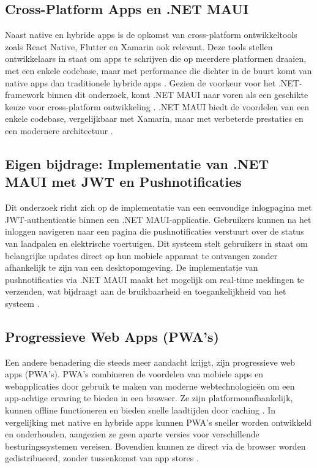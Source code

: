 \subsection{Cross-Platform Apps en .NET MAUI}
\noindent Naast native en hybride apps is de opkomst van cross-platform ontwikkeltools zoals React Native, Flutter en Xamarin ook relevant. Deze tools stellen ontwikkelaars in staat om apps te schrijven die op meerdere platformen draaien, met een enkele codebase, maar met performance die dichter in de buurt komt van native apps dan traditionele hybride apps \autocite{}. Gezien de voorkeur voor het .NET-framework binnen dit onderzoek, komt .NET MAUI naar voren als een geschikte keuze voor cross-platform ontwikkeling \autocite{}. .NET MAUI biedt de voordelen van een enkele codebase, vergelijkbaar met Xamarin, maar met verbeterde prestaties en een modernere architectuur \autocite{}.

\subsection{Eigen bijdrage: Implementatie van .NET MAUI met JWT en Pushnotificaties}
\noindent Dit onderzoek richt zich op de implementatie van een eenvoudige inlogpagina met JWT-authenticatie binnen een .NET MAUI-applicatie. Gebruikers kunnen na het inloggen navigeren naar een pagina die pushnotificaties verstuurt over de status van laadpalen en elektrische voertuigen. Dit systeem stelt gebruikers in staat om belangrijke updates direct op hun mobiele apparaat te ontvangen zonder afhankelijk te zijn van een desktopomgeving. De implementatie van pushnotificaties via .NET MAUI maakt het mogelijk om real-time meldingen te verzenden, wat bijdraagt aan de bruikbaarheid en toegankelijkheid van het systeem \autocite{}.

\subsection{Progressieve Web Apps (PWA’s)}
\noindent Een andere benadering die steeds meer aandacht krijgt, zijn progressieve web apps (PWA's). PWA's combineren de voordelen van mobiele apps en webapplicaties door gebruik te maken van moderne webtechnologieën om een app-achtige ervaring te bieden in een browser. Ze zijn platformonafhankelijk, kunnen offline functioneren en bieden snelle laadtijden door caching \autocite{}. In vergelijking met native en hybride apps kunnen PWA's sneller worden ontwikkeld en onderhouden, aangezien ze geen aparte versies voor verschillende besturingssystemen vereisen. Bovendien kunnen ze direct via de browser worden gedistribueerd, zonder tussenkomst van app stores \autocite{}.

